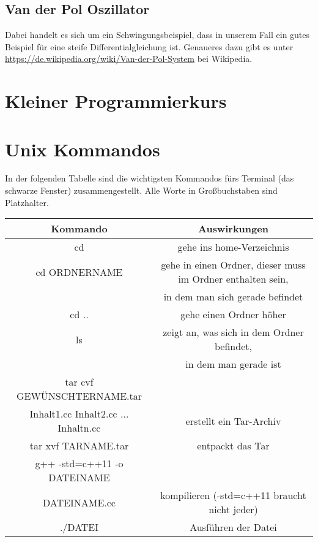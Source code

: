 \documentclass[a4paper,11pt]{article}
\theoremstyle{definition}
\begin{document}
\subsection{Van der Pol Oszillator}
Dabei handelt es sich um ein Schwingungsbeispiel, dass in unserem Fall ein gutes Beispiel für eine steife Differentialgleichung ist. Genaueres dazu gibt es unter \url{https://de.wikipedia.org/wiki/Van-der-Pol-System} bei Wikipedia.




\begin{appendices}

\section{Kleiner Programmierkurs}

\section{Unix Kommandos}
In der folgenden Tabelle sind die wichtigsten Kommandos fürs Terminal (das schwarze Fenster) zusammengestellt. Alle Worte in Großbuchstaben sind Platzhalter.


\begin{tabular}{|c|c|}\hline
   Kommando & Auswirkungen \\ \hline
   cd & gehe ins home-Verzeichnis \\ \hline
   cd ORDNERNAME & gehe in einen Ordner, dieser muss im Ordner enthalten sein, \\ & in dem man sich gerade befindet \\ \hline
   cd .. & gehe einen Ordner höher \\ \hline
   ls & zeigt an, was sich in dem Ordner befindet, \\
   & in dem man gerade ist \\ \hline
   tar cvf GEWÜNSCHTERNAME.tar & \\  Inhalt1.cc Inhalt2.cc ... Inhaltn.cc & erstellt ein Tar-Archiv \\ \hline
   tar xvf TARNAME.tar  & entpackt das Tar \\ \hline
   g++ -std=c++11 -o DATEINAME & \\  DATEINAME.cc & kompilieren (-std=c++11 braucht nicht jeder) \\ \hline
   ./DATEI & Ausführen der Datei \\ \hline
   
   
 \end{tabular}

\end{appendices}



 
\end{document}
